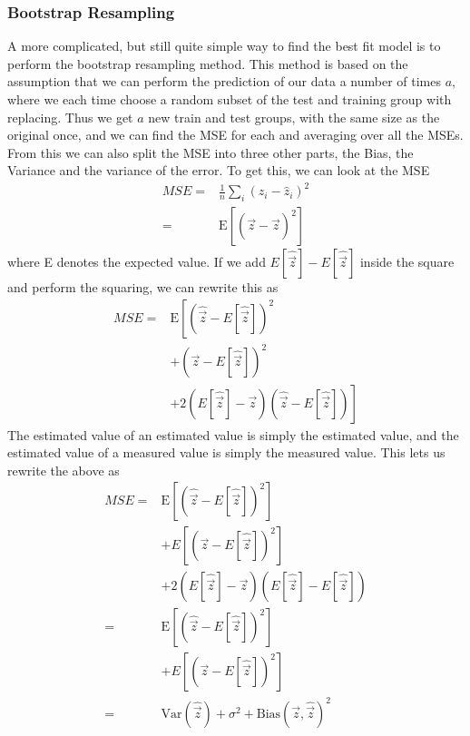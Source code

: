 \documentclass[11pt, A4paper, english]{article}
\begin{document}
\begin{multicols}{2}
				\subsubsection{Bootstrap Resampling}
A more complicated, but still quite simple way to find the best fit model is to perform the bootstrap resampling method. This method is based on the assumption that we can perform the prediction of our data a number of times $a$, where we each time choose a random subset of the test and training group with replacing. Thus we get $a$ new train and test groups, with the same size as the original once, and we can find the MSE for each and averaging over all the MSEs. From this we can also split the MSE into three other parts, the Bias, the Variance and the variance of the error. To get this, we can look at the MSE
				\begin{align*}
MSE =& \frac{1}{n} \sum_{i} \left( z_i - \hat{z}_i \right)^2 \\
=& \text{E}\left[ \left( \vec{z} - \hat{\vec{z}} \right)^2 \right]
				\end{align*}
where E denotes the expected value. If we add $E[\hat{\vec{z}}] - E[\hat{\vec{z}}]$ inside the square and perform the squaring, we can rewrite this as 
				\begin{align*}
MSE =& \text{E}\left[ \left( \hat{\vec{z}} - E[\hat{\vec{z}}] \right)^2 \right. \\
&+ \left( \vec{z} - E[\hat{\vec{z}}] \right)^2 \\
&\left.+ 2 \left( E[\hat{\vec{z}}] - \vec{z} \right) \left( \hat{\vec{z}} - E[\hat{\vec{z}}] \right) \right]
				\end{align*}
The estimated value of an estimated value is simply the estimated value, and the estimated value of a measured value is simply the measured value. This lets us rewrite the above as
				\begin{align*}
MSE =& \text{E}\left[ \left( \hat{\vec{z}} - E[\hat{\vec{z}}] \right)^2 \right] \\
&+ E \left[ \left( \vec{z} - E[\hat{\vec{z}}] \right)^2 \right] \\
&+ 2 \left( E[\hat{\vec{z}}] - \vec{z} \right) \left( E[\hat{\vec{z}}] - E[\hat{\vec{z}}] \right) \\
=& \text{E}\left[ \left( \hat{\vec{z}} - E[\hat{\vec{z}}] \right)^2 \right] \\
&+ E \left[ \left( \vec{z} - E[\hat{\vec{z}}] \right)^2 \right] \\
=& \text{Var}(\hat{\vec{z}}) + \sigma^2 + \text{Bias}(\vec{z}, \hat{\vec{z}})^2

\end{align*}
\end{multicols}
\end{document}
